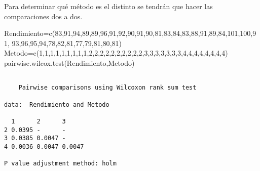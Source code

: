 \documentclass[
  a4paper,
  oneside,
  openany]{book}
\newenvironment{Shaded}{\begin{snugshade}}{\end{snugshade}}
\newcommand{\DecValTok}[1]{\textcolor[rgb]{0.00,0.00,0.81}{#1}}
\newcommand{\FunctionTok}[1]{\textcolor[rgb]{0.00,0.00,0.00}{#1}}
\newcommand{\NormalTok}[1]{#1}
\newcommand{\OtherTok}[1]{\textcolor[rgb]{0.56,0.35,0.01}{#1}}
\begin{document}
Para determinar qué método es el distinto se tendrán que hacer las comparaciones dos a dos.

\begin{Shaded}
\begin{Highlighting}[]
\NormalTok{Rendimiento}\OtherTok{=}\FunctionTok{c}\NormalTok{(}\DecValTok{83}\NormalTok{,}\DecValTok{91}\NormalTok{,}\DecValTok{94}\NormalTok{,}\DecValTok{89}\NormalTok{,}\DecValTok{89}\NormalTok{,}\DecValTok{96}\NormalTok{,}\DecValTok{91}\NormalTok{,}\DecValTok{92}\NormalTok{,}\DecValTok{90}\NormalTok{,}\DecValTok{91}\NormalTok{,}\DecValTok{90}\NormalTok{,}\DecValTok{81}\NormalTok{,}\DecValTok{83}\NormalTok{,}\DecValTok{84}\NormalTok{,}\DecValTok{83}\NormalTok{,}\DecValTok{88}\NormalTok{,}\DecValTok{91}\NormalTok{,}\DecValTok{89}\NormalTok{,}\DecValTok{84}\NormalTok{,}\DecValTok{101}\NormalTok{,}\DecValTok{100}\NormalTok{,}\DecValTok{91}\NormalTok{,}
              \DecValTok{93}\NormalTok{,}\DecValTok{96}\NormalTok{,}\DecValTok{95}\NormalTok{,}\DecValTok{94}\NormalTok{,}\DecValTok{78}\NormalTok{,}\DecValTok{82}\NormalTok{,}\DecValTok{81}\NormalTok{,}\DecValTok{77}\NormalTok{,}\DecValTok{79}\NormalTok{,}\DecValTok{81}\NormalTok{,}\DecValTok{80}\NormalTok{,}\DecValTok{81}\NormalTok{)}
\NormalTok{Metodo}\OtherTok{=}\FunctionTok{c}\NormalTok{(}\DecValTok{1}\NormalTok{,}\DecValTok{1}\NormalTok{,}\DecValTok{1}\NormalTok{,}\DecValTok{1}\NormalTok{,}\DecValTok{1}\NormalTok{,}\DecValTok{1}\NormalTok{,}\DecValTok{1}\NormalTok{,}\DecValTok{1}\NormalTok{,}\DecValTok{1}\NormalTok{,}\DecValTok{2}\NormalTok{,}\DecValTok{2}\NormalTok{,}\DecValTok{2}\NormalTok{,}\DecValTok{2}\NormalTok{,}\DecValTok{2}\NormalTok{,}\DecValTok{2}\NormalTok{,}\DecValTok{2}\NormalTok{,}\DecValTok{2}\NormalTok{,}\DecValTok{2}\NormalTok{,}\DecValTok{2}\NormalTok{,}\DecValTok{3}\NormalTok{,}\DecValTok{3}\NormalTok{,}\DecValTok{3}\NormalTok{,}\DecValTok{3}\NormalTok{,}\DecValTok{3}\NormalTok{,}\DecValTok{3}\NormalTok{,}\DecValTok{3}\NormalTok{,}\DecValTok{4}\NormalTok{,}\DecValTok{4}\NormalTok{,}\DecValTok{4}\NormalTok{,}\DecValTok{4}\NormalTok{,}\DecValTok{4}\NormalTok{,}\DecValTok{4}\NormalTok{,}\DecValTok{4}\NormalTok{,}\DecValTok{4}\NormalTok{)}
\FunctionTok{pairwise.wilcox.test}\NormalTok{(Rendimiento,Metodo)}
\end{Highlighting}
\end{Shaded}

\begin{verbatim}

    Pairwise comparisons using Wilcoxon rank sum test 

data:  Rendimiento and Metodo 

  1      2      3     
2 0.0395 -      -     
3 0.0385 0.0047 -     
4 0.0036 0.0047 0.0047

P value adjustment method: holm 
\end{verbatim}
\end{document}
